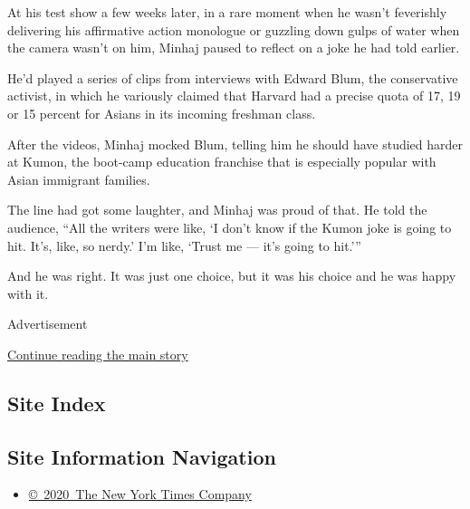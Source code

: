 At his test show a few weeks later, in a rare moment when he wasn't
feverishly delivering his affirmative action monologue or guzzling down
gulps of water when the camera wasn't on him, Minhaj paused to reflect
on a joke he had told earlier.

He'd played a series of clips from interviews with Edward Blum, the
conservative activist, in which he variously claimed that Harvard had a
precise quota of 17, 19 or 15 percent for Asians in its incoming
freshman class.

After the videos, Minhaj mocked Blum, telling him he should have studied
harder at Kumon, the boot-camp education franchise that is especially
popular with Asian immigrant families.

The line had got some laughter, and Minhaj was proud of that. He told
the audience, ``All the writers were like, `I don't know if the Kumon
joke is going to hit. It's, like, so nerdy.' I'm like, `Trust me ---
it's going to hit.'''

And he was right. It was just one choice, but it was his choice and he
was happy with it.

Advertisement

\protect\hyperlink{after-bottom}{Continue reading the main story}

\hypertarget{site-index}{%
\subsection{Site Index}\label{site-index}}

\hypertarget{site-information-navigation}{%
\subsection{Site Information
Navigation}\label{site-information-navigation}}

\begin{itemize}
\tightlist
\item
  \href{https://help.nytimes.com/hc/en-us/articles/115014792127-Copyright-notice}{©~2020~The
  New York Times Company}
\end{itemize}

